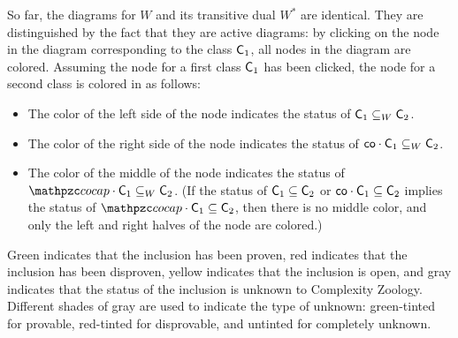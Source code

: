So far, the diagrams for $W$ and its transitive dual $W^*$ are identical. They
are distinguished by the fact that they are active diagrams: by clicking on the
node in the diagram corresponding to the class $\mathsf{C}_1$, all nodes in the diagram
are colored. Assuming the node for a first class $\mathsf{C}_1$ has been clicked, the
node for a second class is colored in as follows:
\begin{itemize}
\item The color of the left side of the node indicates the status of
  $\mathsf{C}_1\subseteq_W\mathsf{C}_2$.
\item The color of the right side of the node indicates the status of
  $\mathsf{co}\cdot\mathsf{C}_1\subseteq_W\mathsf{C}_2$.
\item The color of the middle of the node indicates the status of
  $\cocap\cdot\sC_1\subseteq_W\sC_2$. (If the status of $\mathsf{C}_1\subseteq\mathsf{C}_2$ or
  $\mathsf{co}\cdot\mathsf{C}_1\subseteq\mathsf{C}_2$ implies the status of
  $\cocap\cdot\sC_1\subseteq\sC_2$, then there is no middle color, and only the
  left and right halves of the node are colored.)
\end{itemize}
Green indicates that the inclusion has been proven, red indicates that the
inclusion has been disproven, yellow indicates that the inclusion is open, and
gray indicates that the status of the inclusion is unknown to Complexity
Zoology. Different shades of gray are used to indicate the type of unknown:
green-tinted for provable, red-tinted for disprovable, and untinted for
completely unknown.

